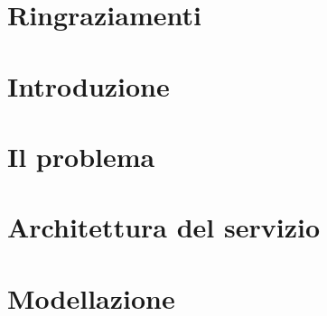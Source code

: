 




\cleardoublepage

%


\chapter*{Ringraziamenti}{}
\thispagestyle{empty}
\cleardoublepage

\newpage
\setcounter{page}{1}
\pagestyle{headings}

\renewcommand{\contentsname}{Tabella dei contenuti}
\tableofcontents
\cleardoublepage

\newpage
\setcounter{page}{1}

\chapter*{Introduzione}
{}

\chapter{Il problema}\label{chapter:introduzione_al_problema}


\chapter{Architettura del servizio}\label{chapter:architettura}


\chapter{Modellazione}\label{chapter:modellazione}


